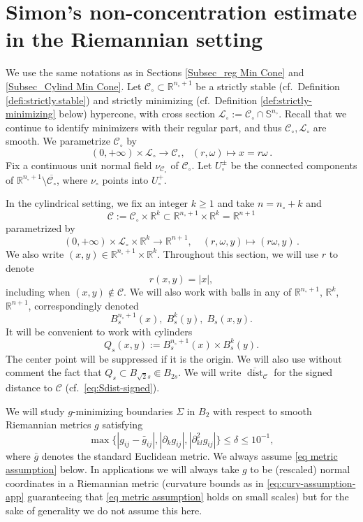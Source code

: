 \documentclass[11pt, letterpaper, reqno]{amsart}
\numberwithin{equation}{section}
\theoremstyle{remark}
\newcommand{\RR}{\mathbb{R}}
\newcommand{\SSp}{\mathbb{S}}
\newcommand{\cC}{\mathcal{C}}
\newcommand{\cL}{\mathcal{L}}
\newcommand{\dist}{\operatorname{dist}}
\newcommand{\Sdist}{\overline{\dist}}
\begin{document}

\section{Simon's non-concentration estimate in the Riemannian setting}	

  We use the same notations as in Sections \ref{Subsec_reg Min Cone} and \ref{Subsec_Cylind Min Cone}. Let $\cC_\circ\subset \RR^{n_\circ+1}$ be a strictly stable (cf.\ Definition \ref{defi:strictly.stable}) and strictly minimizing (cf.\ Definition \ref{def:strictly-minimizing} below) hypercone, with cross section $\cL_\circ:= \cC_\circ\cap \SSp^{n_\circ}$. Recall that we continue to identify minimizers with their regular part, and thus $\cC_\circ, \cL_\circ$ are smooth. We parametrize $\cC_\circ$ by 
  \[
    (0, +\infty)\times \cL_\circ \to \cC_\circ, \ \ \ (r, \omega) \mapsto x= r\omega\,.
  \]
  Fix a continuous unit normal field $\nu_{\cC_\circ}$ of $\cC_\circ$. Let $U_\circ^\pm$ be the connected components of $\RR^{n_\circ+1}\setminus \overline{\cC_\circ}$, where $\nu_\circ$ points into $U_\circ^+$.
  
  In the cylindrical setting, we fix an integer $k\geq 1$ and take $n=n_\circ +k$ and
  \[ \cC:= \cC_\circ\times \RR^k\subset \RR^{n_\circ+1} \times \RR^k = \RR^{n+1} \]
   parametrized by \[
     (0, +\infty)\times \cL_\circ\times \RR^k \to \RR^{n+1}, \quad (r, \omega, y)\mapsto (r\omega, y)\,.
   \]
   We also write $(x,y) \in \RR^{n_\circ+1}\times \RR^k$. Throughout this section, we will use $r$ to denote
    \[ r(x,y) = |x|, \]
    including when $(x,y) \not \in \cC$. We will also work with balls in any of $\RR^{n_\circ+1}$, $\RR^k$, $\RR^{n+1}$, correspondingly denoted 
    \[ B^{n_\circ+1}_s(x), \; B^k_s(y), \; B_s(x,y). \]
    It will be convenient to work with cylinders
   \[ Q_s(x,y) := B^{n_\circ+1}_s(x) \times B^k_s(y). \]
   The center point will be suppressed if it is the origin. We will also use without comment the fact that $Q_s \subset B_{\sqrt{2} s} \Subset B_{2s}$. We will write $\Sdist_\cC$ for the signed distance to $\cC$ (cf.\ \eqref{eq:Sdist-signed}). 

   We will study $g$-minimizing boundaries $\Sigma$ in $B_2$ with respect to smooth Riemannian metrics $g$ satisfying
\begin{equation}\label{eq metric assumption}
\max\{|g_{ij} - \bar{g}_{ij}| , |\partial_k g_{ij}| , |\partial^2_{kl}g_{ij}|\} \leq \delta \leq 10^{-1},
\end{equation}
    where $\bar g$ denotes the standard Euclidean metric.  We always assume \eqref{eq metric assumption} below. In applications we will always take $g$ to be (rescaled) normal coordinates in a Riemannian metric (curvature bounds as in \eqref{eq:curv-assumption-app} guaranteeing that \eqref{eq metric assumption} holds on small scales) but for the sake of generality we do not assume this here.
    
\end{document}
